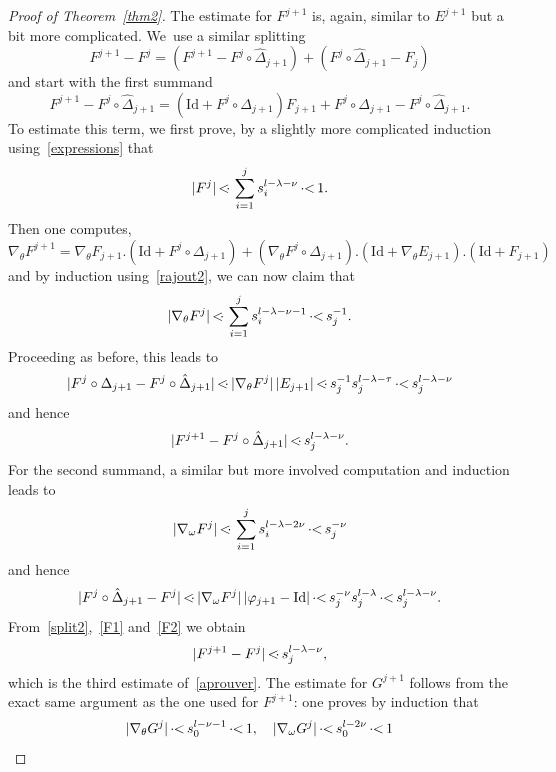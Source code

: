 \documentclass[JEP,XML,SOM,Unicode]{cedram}
\numberwithin{equation}{section}
\theoremstyle{plain}
\theoremstyle{definition}
\newcommand\MP{\,{<\hspace{-.5em}\cdot}\,}
\newcommand\PM{\,{\cdot\hspace{-.3em}<}\,}
\begin{document}
\begin{proof}[Proof of Theorem~\ref{thm2}]
The estimate for $F^{j+1}$ is, again, similar to $E^{j+1}$ but a bit more complicated. We~use a similar splitting
\begin{equation}\label{split2}
F^{j+1}-F^{j}=(F^{j+1}-F^j \circ \hat{\Delta}_{j+1})+(F^j \circ \hat{\Delta}_{j+1}-F_j)
\end{equation}
and start with the first summand
\begin{equation}
F^{j+1}-F^j \circ \hat{\Delta}_{j+1}=(\mathrm{Id}+F^j \circ \Delta_{j+1})F_{j+1}+F^j \circ \Delta_{j+1}-F^j \circ \hat{\Delta}_{j+1}.
\end{equation}
To estimate this term, we first prove, by a slightly more complicated induction using~\eqref{expressions} that
\begin{equation}\label{rajout2}
|F^j| \MP \sum_{i=1}^j s_i^{l-\lambda-\nu} \PM 1.
\end{equation}
Then one computes,
\[ \nabla_\theta F^{j+1}=\nabla_\theta F_{j+1}.(\mathrm{Id}+F^{j}\circ \Delta_{j+1})+(\nabla_\theta F^j \circ \Delta_{j+1}).(\mathrm{Id}+\nabla_\theta E_{j+1}).(\mathrm{Id}+F_{j+1}) \]
and by induction using~\eqref{rajout2}, we can now claim that
\begin{equation*}
|\nabla_\theta F^j| \MP \sum_{i=1}^j s_i^{l-\lambda-\nu-1} \PM s_j^{-1}.
\end{equation*}
Proceeding as before, this leads to
\[ |F^j \circ \Delta_{j+1}-F^j \circ \hat{\Delta}_{j+1}| \MP |\nabla_\theta F^j|\,|E_{j+1}| \MP s_j^{-1}s_j^{l-\lambda-\tau} \PM s_j^{l-\lambda-\nu} \]
and hence
\begin{equation}\label{F1}
|F^{j+1}-F^j \circ \hat{\Delta}_{j+1}| \MP s_j^{l-\lambda-\nu}.
\end{equation}
For the second summand, a similar but more involved computation and induction leads to
\begin{equation*}
|\nabla_\omega F^j| \MP \sum_{i=1}^j s_i^{l-\lambda-2\nu} \PM s_j^{-\nu}
\end{equation*}
and hence
\begin{equation}\label{F2}
|F^j \circ \hat{\Delta}_{j+1}-F^j| \MP |\nabla_\omega F^j|\,|\varphi_{j+1}-\mathrm{Id}| \PM s_j^{-\nu} s_j^{l-\lambda} \PM s_j^{l-\lambda-\nu} .
\end{equation}
From~\eqref{split2},~\eqref{F1} and~\eqref{F2} we obtain
\[ |F^{j+1} -F^j| \MP s_j^{l-\lambda-\nu}, \]
which is the third estimate of~\eqref{aprouver}. The estimate for $G^{j+1}$ follows from the exact same argument as the one used for $F^{j+1}$: one proves by induction that
\[ |\nabla_\theta G^j| \PM s_0^{l-\nu-1} \PM 1, \quad |\nabla_\omega G^j| \PM s_0^{l-2\nu} \PM 1 \]

\end{proof}
\end{document}

